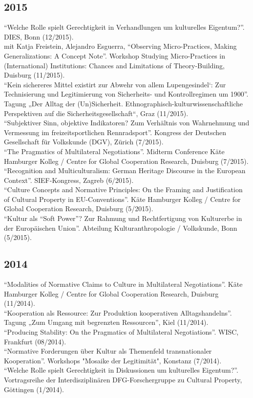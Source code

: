 \documentclass[11pt, a4paper]{article} %
\begin{document}
\subsection*{2015}
\enquote{Welche Rolle spielt Gerechtigkeit in Verhandlungen um kulturelles Eigentum?}. DIES, Bonn (12/2015).\\[.25cm]
mit Katja Freistein, Alejandro Esguerra, \enquote{Observing Micro-Practices, Making Generalizations: A Concept Note}. Workshop Studying Micro-Practices in (International) Institutions: Chances and Limitations of Theory-Building, Duisburg (11/2015).\\[.25cm]
\enquote{Kein sichereres Mittel existirt zur Abwehr von allem Lupengesindel‘: Zur Technisierung und Legitimierung von Sicherheits- und Kontrollregimen um 1900}. Tagung „Der Alltag der (Un)Sicherheit. Ethnographisch-kulturwissenschaftliche Perspektiven auf die Sicherheitsgesellschaft“, Graz (11/2015).\\[.25cm]
\enquote{Subjektiver Sinn, objektive Indikatoren? Zum Verhältnis von Wahrnehmung und Vermessung im freizeitsportlichen Rennradsport}. Kongress der Deutschen Gesellschaft für Volkskunde (DGV), Zürich (7/2015).\\[.25cm]
\enquote{The Pragmatics of Multilateral Negotiations}. Midterm Conference Käte Hamburger Kolleg / Centre for Global Cooperation Research, Duisburg (7/2015).\\[.25cm]
\enquote{Recognition and Multiculturalism: German Heritage Discourse in the European Context}. SIEF-Kongress, Zagreb (6/2015).\\[.25cm]
\enquote{Culture Concepts and Normative Principles: On the Framing and Justification of Cultural Property in EU-Conventions}. Käte Hamburger Kolleg / Centre for Global Cooperation Research, Duisburg (5/2015).\\[.25cm]
\enquote{Kultur als “Soft Power”? Zur Rahmung und Rechtfertigung von Kulturerbe in der Europäischen Union}. Abteilung Kulturanthropologie / Volkskunde, Bonn (5/2015).
\subsection*{2014}
\enquote{Modalities of Normative Claims to Culture in Multilateral Negotiations}. Käte Hamburger Kolleg / Centre for Global Cooperation Research, Duisburg (11/2014).\\[.25cm]
\enquote{Kooperation als Ressource: Zur Produktion kooperativen Alltagshandelns}. Tagung „Zum Umgang mit begrenzten Ressourcen”, Kiel (11/2014).\\[.25cm]
\enquote{Producing Stability: On the Pragmatics of Multilateral Negotiations}. WISC, Frankfurt (08/2014).\\[.25cm]
\enquote{Normative Forderungen über Kultur als Themenfeld transnationaler Kooperation}. Workshops "Mosaike der Legitimität", Konstanz (7/2014).\\[.25cm]
\enquote{Welche Rolle spielt Gerechtigkeit in Diskussionen um kulturelles Eigentum?}. Vortragsreihe der Interdisziplinären DFG-Forschergruppe zu Cultural Property, Göttingen (1/2014).
\end{document}
